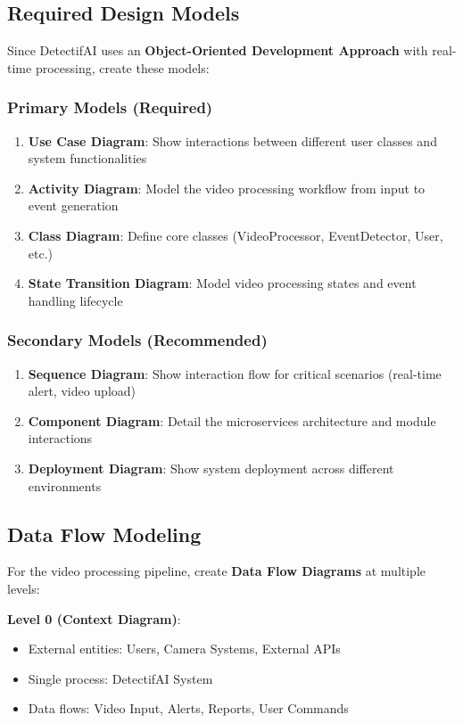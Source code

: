 \documentclass[12pt,a4paper]{article}
\begin{document}
\subsection{Required Design Models}

Since DetectifAI uses an \textbf{Object-Oriented Development Approach} with real-time processing, create these models:

\subsubsection{Primary Models (Required)}
\begin{enumerate}
    \item \textbf{Use Case Diagram}: Show interactions between different user classes and system functionalities
    \item \textbf{Activity Diagram}: Model the video processing workflow from input to event generation
    \item \textbf{Class Diagram}: Define core classes (VideoProcessor, EventDetector, User, etc.)
    \item \textbf{State Transition Diagram}: Model video processing states and event handling lifecycle
\end{enumerate}

\subsubsection{Secondary Models (Recommended)}
\begin{enumerate}
    \item \textbf{Sequence Diagram}: Show interaction flow for critical scenarios (real-time alert, video upload)
    \item \textbf{Component Diagram}: Detail the microservices architecture and module interactions
    \item \textbf{Deployment Diagram}: Show system deployment across different environments
\end{enumerate}

\subsection{Data Flow Modeling}

For the video processing pipeline, create \textbf{Data Flow Diagrams} at multiple levels:

\textbf{Level 0 (Context Diagram)}:
\begin{itemize}
    \item External entities: Users, Camera Systems, External APIs
    \item Single process: DetectifAI System
    \item Data flows: Video Input, Alerts, Reports, User Commands
\end{itemize}
\end{document}
